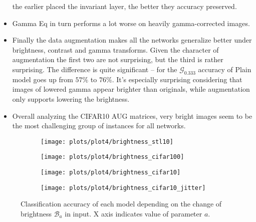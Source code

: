 \begin{itemize}
        the earlier placed the invariant layer, the better they accuracy
        preserved.
    \item Gamma Eq in turn performs a lot worse on heavily gamma-corrected
        images.
    \item Finally the data augmentation makes all the networks generalize better
        under brightness, contrast and gamma transforms. Given the character of
        augmentation the first two are not surprising, but the third is rather
        surprising. The difference is quite significant -- for the
        $\mathcal{G}_0.333$ accuracy of Plain model goes up from $57\%$ to
        $76\%$. It's especially surprising considering that images of lowered
        gamma appear brighter than originals, while augmentation only supports
        lowering the brightness.
    \item Overall analyzing the CIFAR10 AUG matrices, very bright images
        seem to be the most challenging group of instances for all networks.
    \end{itemize}



    \begin{figure}[h!]
    \begin{adjustwidth}{-5em}{-5em}
        \centering
        \begin{subfigure}{0.5\textwidth}
            \texttt{[image: plots/plot4/brightness\_stl10]}
        \end{subfigure}
        \begin{subfigure}{0.5\textwidth}
            \texttt{[image: plots/plot4/brightness\_cifar100]}
        \end{subfigure}
        \begin{subfigure}{0.5\textwidth}
            \texttt{[image: plots/plot4/brightness\_cifar10]}
        \end{subfigure}
        \begin{subfigure}{0.5\textwidth}
            \texttt{[image: plots/plot4/brightness\_cifar10\_jitter]}
        \end{subfigure}
    \end{adjustwidth}
        \caption{Classification accuracy of each model depending on the change
        of brightness $\mathcal{B}_a$ in input. X axis indicates value of
        parameter $a$.}
        \label{fig:plot4brightness}
    \end{figure}


